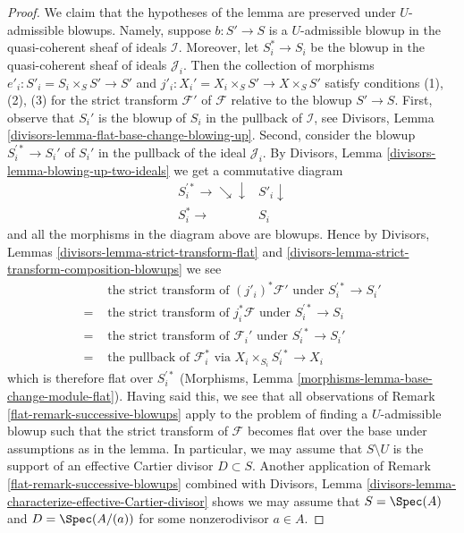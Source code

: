 \begin{proof}

We claim that the hypotheses of the lemma are preserved under $U$-admissible
blowups. Namely, suppose $b : S' \to S$ is a $U$-admissible blowup in
the quasi-coherent sheaf of ideals $\mathcal{I}$. Moreover, let $S^*_i \to S_i$
be the blowup in the quasi-coherent sheaf of ideals $\mathcal{J}_i$.
Then the collection of morphisms $e'_i : S'_i = S_i \times_S S' \to S'$
and $j'_i : X_i' = X_i \times_S S' \to X \times_S S'$ satisfy conditions
(1), (2), (3) for the strict transform $\mathcal{F}'$ of $\mathcal{F}$
relative to the blowup $S' \to S$. First, observe that $S_i'$ is the
blowup of $S_i$ in the pullback of $\mathcal{I}$, see
Divisors, Lemma \ref{divisors-lemma-flat-base-change-blowing-up}.
Second, consider the blowup
$S_i^{\prime *} \to S_i'$ of $S_i'$ in the pullback of the ideal
$\mathcal{J}_i$.
By Divisors, Lemma \ref{divisors-lemma-blowing-up-two-ideals}
we get a commutative diagram
$$
\begin{array}{cc}S_i^{\prime *} \longrightarrow\searrow\downarrow & S'_i \downarrow \\ S_i^* \longrightarrow & S_i\end{array}
$$
and all the morphisms in the diagram above are blowups. Hence by
Divisors, Lemmas \ref{divisors-lemma-strict-transform-flat} and
\ref{divisors-lemma-strict-transform-composition-blowups}
we see
\begin{align*}
& \text{ the strict transform of }(j'_i)^*\mathcal{F}'\text{ under }
S_i^{\prime *} \to S_i' \\
= &
\text{ the strict transform of }j_i^*\mathcal{F}\text{ under }
S_i^{\prime *} \to S_i \\
= &
\text{ the strict transform of }\mathcal{F}_i'\text{ under }
S_i^{\prime *} \to S_i' \\
= &
\text{ the pullback of }\mathcal{F}_i^*\text{ via }
X_i \times_{S_i} S_i^{\prime *} \to X_i
\end{align*}
which is therefore flat over $S_i^{\prime *}$
(Morphisms, Lemma \ref{morphisms-lemma-base-change-module-flat}).
Having said this, we see that all observations of
Remark \ref{flat-remark-successive-blowups} apply to the
problem of finding a $U$-admissible blowup such that the
strict transform of $\mathcal{F}$ becomes flat over the base
under assumptions as in the lemma. In particular, we may assume
that $S \setminus U$ is the support of an effective Cartier divisor
$D \subset S$. Another application of Remark \ref{flat-remark-successive-blowups}
combined with
Divisors, Lemma \ref{divisors-lemma-characterize-effective-Cartier-divisor}
shows we may assume that $S = \Spec(A)$ and $D = \Spec(A/(a))$
for some nonzerodivisor $a \in A$.


\end{proof}
